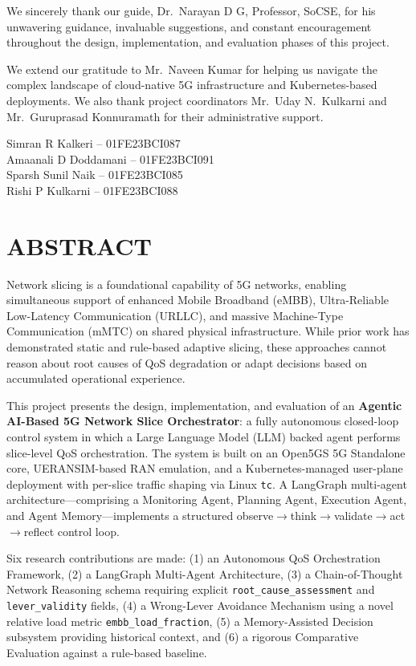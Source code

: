 \documentclass[12pt,a4paper]{report}
\begin{document}
We sincerely thank our guide, Dr.\ Narayan D G, Professor, SoCSE, for his unwavering guidance, invaluable suggestions, and constant encouragement throughout the design, implementation, and evaluation phases of this project.

We extend our gratitude to Mr.\ Naveen Kumar for helping us navigate the complex landscape of cloud-native 5G infrastructure and Kubernetes-based deployments. We also thank project coordinators Mr.\ Uday N.\ Kulkarni and Mr.\ Guruprasad Konnuramath for their administrative support.

\vspace{2cm}
\begin{flushright}
Simran R Kalkeri -- 01FE23BCI087 \\
Amaanali D Doddamani -- 01FE23BCI091 \\
Sparsh Sunil Naik -- 01FE23BCI085 \\
Rishi P Kulkarni -- 01FE23BCI088
\end{flushright}

\newpage
\chapter*{ABSTRACT}
Network slicing is a foundational capability of 5G networks, enabling simultaneous support of enhanced Mobile Broadband (eMBB), Ultra-Reliable Low-Latency Communication (URLLC), and massive Machine-Type Communication (mMTC) on shared physical infrastructure. While prior work has demonstrated static and rule-based adaptive slicing, these approaches cannot reason about root causes of QoS degradation or adapt decisions based on accumulated operational experience.

This project presents the design, implementation, and evaluation of an \textbf{Agentic AI-Based 5G Network Slice Orchestrator}: a fully autonomous closed-loop control system in which a Large Language Model (LLM) backed agent performs slice-level QoS orchestration. The system is built on an Open5GS 5G Standalone core, UERANSIM-based RAN emulation, and a Kubernetes-managed user-plane deployment with per-slice traffic shaping via Linux \texttt{tc}. A LangGraph multi-agent architecture---comprising a Monitoring Agent, Planning Agent, Execution Agent, and Agent Memory---implements a structured observe$\rightarrow$think$\rightarrow$validate$\rightarrow$act$\rightarrow$reflect control loop.

Six research contributions are made: (1) an Autonomous QoS Orchestration Framework, (2) a LangGraph Multi-Agent Architecture, (3) a Chain-of-Thought Network Reasoning schema requiring explicit \texttt{root\_cause\_assessment} and \texttt{lever\_validity} fields, (4) a Wrong-Lever Avoidance Mechanism using a novel relative load metric \texttt{embb\_load\_fraction}, (5) a Memory-Assisted Decision subsystem providing historical context, and (6) a rigorous Comparative Evaluation against a rule-based baseline.
\end{document}

